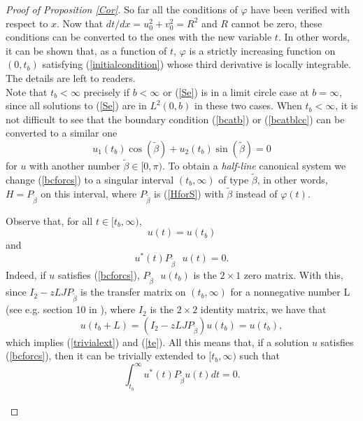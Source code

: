 \documentclass[preprint,12pt]{elsarticle}
\begin{document}
\begin{proof}[Proof of Proposition \ref{Cor}]
So far all the conditions of $\varphi$ have been verified with respect to $x$. Now that $dt/dx=u^2_0+v^2_0=R^2$ and $R$ cannot be zero, these conditions can be converted to the ones with the new variable $t$. In other words, it can be shown that, as a function of $t$,  $\varphi$ is a strictly increasing function on $(0,t_b)$ satisfying (\ref{initialcondition}) whose third derivative is locally integrable. The details are left to readers.\\ 

Note that $t_b<\infty$ precisely if $b<\infty$ or (\ref{Se}) is in a limit circle case at $b=\infty$, since all solutions to (\ref{Se}) are in $L^2(0,b)$ in these two cases. 
When $t_b<\infty$, it is not difficult to see that the boundary condition (\ref{bcatb}) or (\ref{bcatblcc}) can be converted to a similar one 
\begin{equation}\label{bcforcs}
u_1(t_b) \cos(\tilde{\beta})+u_2(t_b) \sin(\tilde{\beta})=0
\end{equation}
for $u$  with another number $\tilde{\beta}\in [0,\pi)$. To obtain a \textit{half-line} canonical system we change (\ref{bcforcs}) to a singular interval $(t_b, \infty)$ of type $\tilde{\beta}$, in other words, $H=P_{\tilde{\beta}}$ on this interval, where $P_{\tilde{\beta}}$ is (\ref{HforS}) with $\tilde{\beta}$ instead of $\varphi(t)$. 

Observe that, for all $t\in[t_b,\infty)$, 
\begin{equation}\label{trivialext}
u(t)=u(t_b)
\end{equation}
and 
\begin{equation}\label{te}
u^*(t)P_{\tilde{\beta}}\textrm{ }u(t)=0. 
\end{equation}
Indeed, if $u$ satisfies (\ref{bcforcs}), $P_{\tilde{\beta}}\textrm{ }u(t_b)$ is the $2\times 1$ zero matrix. With this, since $I_{2}-zLJP_{\tilde{\beta}}$ is the transfer matrix on $(t_b,\infty)$ for a nonnegative number L (see e.g. section 10 in  \cite{RemdB}), where $I_2$ is the $2\times2$ identity matrix, we have that   
\begin{equation*}
u(t_b+L)=(I_2-zLJP_{\tilde{\beta}})u(t_b)=u(t_b),
\end{equation*}
which implies (\ref{trivialext}) and (\ref{te}). All this means that, if a solution $u$ satisfies (\ref{bcforcs}), then it can be trivially extended to $[t_b,\infty)$ such that 
\begin{equation}\label{extofu}
\int_{t_b}^{\infty} u^*(t)P_{\tilde{\beta}}u(t) dt=0.
\end{equation}\\


\end{proof}
\end{document}
